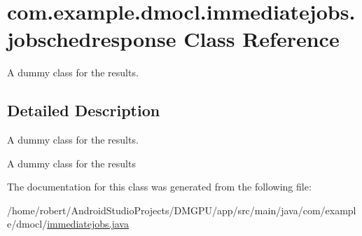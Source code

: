 \hypertarget{classcom_1_1example_1_1dmocl_1_1immediatejobs_1_1jobschedresponse}{}\section{com.\+example.\+dmocl.\+immediatejobs.\+jobschedresponse Class Reference}
\label{classcom_1_1example_1_1dmocl_1_1immediatejobs_1_1jobschedresponse}


A dummy class for the results.  




\subsection{Detailed Description}
A dummy class for the results. 

A dummy class for the results 

The documentation for this class was generated from the following file\+:\begin{DoxyCompactItemize}
\item 
/home/robert/\+Android\+Studio\+Projects/\+D\+M\+G\+P\+U/app/src/main/java/com/example/dmocl/\mbox{\hyperlink{immediatejobs_8java}{immediatejobs.\+java}}\end{DoxyCompactItemize}
